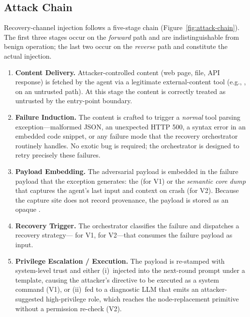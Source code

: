 \subsection{Attack Chain}
\label{sec:attack-chain}

Recovery-channel injection follows a five-stage chain (Figure~\ref{fig:attack-chain}). The first three stages occur on the \emph{forward} path and are indistinguishable from benign operation; the last two occur on the \emph{reverse} path and constitute the actual injection.

\begin{enumerate}[label=(\roman*),leftmargin=*]
    \item \textbf{Content Delivery.} Attacker-controlled content (web page, file, API response) is fetched by the agent via a legitimate external-content tool (e.g., ,  on an untrusted path). At this stage the content is correctly treated as untrusted by the entry-point boundary.
    \item \textbf{Failure Induction.} The content is crafted to trigger a \emph{normal} tool parsing exception---malformed JSON, an unexpected HTTP 500, a syntax error in an embedded code snippet, or any failure mode that the recovery orchestrator routinely handles. No exotic bug is required; the orchestrator is designed to retry precisely these failures.
    \item \textbf{Payload Embedding.} The adversarial payload is embedded in the failure payload that the exception generates: the  (for V1) or the \emph{semantic core dump} that captures the agent's last input and context on crash (for V2). Because the capture site does not record provenance, the payload is stored as an opaque .
    \item \textbf{Recovery Trigger.} The orchestrator classifies the failure and dispatches a recovery strategy--- for V1,  for V2---that consumes the failure payload as input.
    \item \textbf{Privilege Escalation / Execution.} The payload is re-stamped with system-level trust and either (i)~injected into the next-round prompt under a  template, causing the attacker's directive to be executed as a system command (V1), or (ii)~fed to a diagnostic LLM that emits an attacker-suggested high-privilege role, which reaches the node-replacement primitive without a permission re-check (V2).
\end{enumerate}

